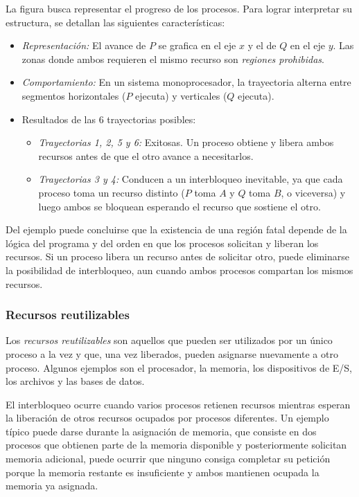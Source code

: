 La figura busca representar el progreso de los procesos. Para lograr interpretar su estructura, se detallan las siguientes características:
\begin{itemize}
  \item \textit{Representación:} El avance de \(P\) se grafica en el eje \(x\) y el de \(Q\) en el eje \(y\). Las zonas donde ambos requieren el mismo recurso son \textit{regiones prohibidas}.
  \item \textit{Comportamiento:} En un sistema monoprocesador, la trayectoria alterna entre segmentos horizontales (\(P\) ejecuta) y verticales (\(Q\) ejecuta).
  \item Resultados de las 6 trayectorias posibles:
  \begin{itemize}
    \item \textit{Trayectorias 1, 2, 5 y 6:} Exitosas. Un proceso obtiene y libera ambos recursos antes de que el otro avance a necesitarlos.
    \item \textit{Trayectorias 3 y 4:} Conducen a un interbloqueo inevitable, ya que cada proceso toma un recurso distinto (\(P\) toma \(A\) y \(Q\) toma \(B\), o viceversa) y luego ambos se bloquean esperando el recurso que sostiene el otro.
  \end{itemize}
\end{itemize}

Del ejemplo puede concluirse que la existencia de una región fatal depende de la lógica del programa y del orden en que los procesos solicitan y liberan los recursos. Si un proceso libera un recurso antes de solicitar otro, puede eliminarse la posibilidad de interbloqueo, aun cuando ambos procesos compartan los mismos recursos.

\subsubsection{Recursos reutilizables}

Los \textit{recursos reutilizables} son aquellos que pueden ser utilizados por un único proceso a la vez y que, una vez liberados, pueden asignarse nuevamente a otro proceso. Algunos ejemplos son el procesador, la memoria, los dispositivos de E/S, los archivos y las bases de datos.

El interbloqueo ocurre cuando varios procesos retienen recursos mientras esperan la liberación de otros recursos ocupados por procesos diferentes. Un ejemplo típico puede darse durante la asignación de memoria, que consiste en dos procesos que obtienen parte de la memoria disponible y posteriormente solicitan memoria adicional, puede ocurrir que ninguno consiga completar su petición porque la memoria restante es insuficiente y ambos mantienen ocupada la memoria ya asignada.

